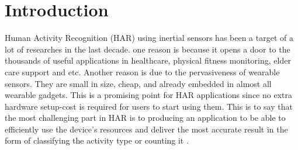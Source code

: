 \documentclass[journal,article,submit,moreauthors,pdftex]{Definitions/mdpi}
\begin{document}


\section{Introduction}

Human Activity Recognition (HAR) using inertial sensors has been a target of a lot of researches in the last decade. one reason is because it opens a door to the thousands of useful applications in healthcare\cite{sow2013mining}, physical fitness monitoring, elder care support and etc. Another reason is due to the pervasiveness of wearable sensors. They are small in size, cheap, and already embedded in almost all wearable gadgets. This is a promising point for HAR applications since no extra hardware setup-cost is required for users to start using them. This is to say that the most challenging part in HAR is to producing an application to be able to efficiently use the device's resources and deliver the most accurate result in the form of classifying the activity type or counting it \cite{schilit1994context}.\\
\end{document}
